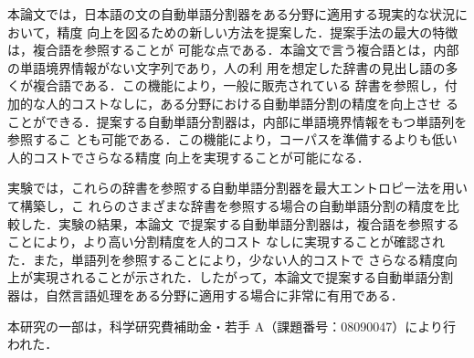 \documentclass[japanese]{jnlp_JS2.0}
\begin{document}
本論文では，日本語の文の自動単語分割器をある分野に適用する現実的な状況において，精度
向上を図るための新しい方法を提案した．提案手法の最大の特徴は，複合語を参照することが
可能な点である．本論文で言う複合語とは，内部の単語境界情報がない文字列であり，人の利
用を想定した辞書の見出し語の多くが複合語である．この機能により，一般に販売されている
辞書を参照し，付加的な人的コストなしに，ある分野における自動単語分割の精度を向上させ
ることができる．提案する自動単語分割器は，内部に単語境界情報をもつ単語列を参照するこ
とも可能である．この機能により，コーパスを準備するよりも低い人的コストでさらなる精度
向上を実現することが可能になる．

実験では，これらの辞書を参照する自動単語分割器を最大エントロピー法を用いて構築し，こ
れらのさまざまな辞書を参照する場合の自動単語分割の精度を比較した．実験の結果，本論文
で提案する自動単語分割器は，複合語を参照することにより，より高い分割精度を人的コスト
なしに実現することが確認された．また，単語列を参照することにより，少ない人的コストで
さらなる精度向上が実現されることが示された．したがって，本論文で提案する自動単語分割
器は，自然言語処理をある分野に適用する場合に非常に有用である．

\acknowledgment

本研究の一部は，科学研究費補助金・若手 A（課題番号：08090047）により行われた．
\end{document}
